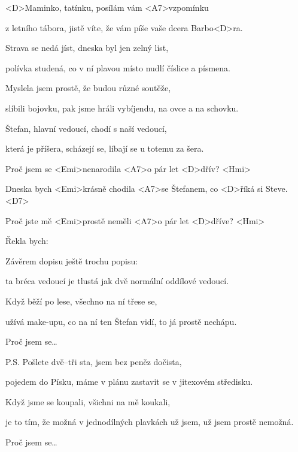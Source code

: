 

\zs
<D>Maminko, tatínku, posílám vám <A7>vzpomínku

z letního tábora, jistě víte, že vám píše vaše dcera Barbo<D>ra.
\ks

\zs 
Strava se nedá jíst, dneska byl jen zelný list,

polívka studená, co v ní plavou místo nudlí číslice a písmena.
\ks
 
\zs
Myslela jsem prostě, že budou různé soutěže,

slíbili bojovku, pak jsme hráli vybíjendu, na ovce a na schovku.
\ks
 
\zs
Štefan, hlavní vedoucí, chodí s naší vedoucí,

která je příšera, scházejí se, líbají se u totemu za šera.
\ks
 
\zr
Proč jsem se <Emi>nenarodila <A7>o pár let <D>dřív? <Hmi>

Dneska bych <Emi>krásně chodila <A7>se Štefanem, co <D>říká si Steve. <D7>

Proč jste mě <Emi>prostě neměli <A7>o pár let <D>dříve? <Hmi>

Řekla bych: 
\kr
 
\zs
Závěrem dopisu ještě trochu popisu:

ta bréca vedoucí je tlustá jak dvě normální oddílové vedoucí.
\ks
 
\zs
Když běží po lese, všechno na ní třese se,

užívá make-upu, co na ní ten Štefan vidí, to já prostě nechápu.
\ks
 
\zr
Proč jsem se…
\kr
 
\zs
P.S. Pošlete dvě–tři sta, jsem bez peněz dočista,

pojedem do Písku, máme v plánu zastavit se v jitexovém středisku.
\ks

\zs 
Když jsme se koupali, všichni na mě koukali,

je to tím, že možná v jednodílných plavkách už jsem, 
už jsem prostě nemožná.
\ks

\zr
Proč jsem se…
\kr

\kp
